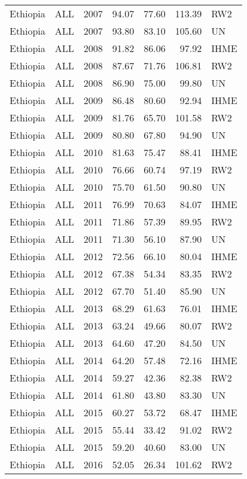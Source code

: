 \begin{longtable}{lllrrrl}
  Ethiopia & ALL & 2007 & 94.07 & 77.60 & 113.39 & RW2 \\ 
  Ethiopia & ALL & 2007 & 93.80 & 83.10 & 105.60 & UN \\ 
  Ethiopia & ALL & 2008 & 91.82 & 86.06 & 97.92 & IHME \\ 
  Ethiopia & ALL & 2008 & 87.67 & 71.76 & 106.81 & RW2 \\ 
  Ethiopia & ALL & 2008 & 86.90 & 75.00 & 99.80 & UN \\ 
  Ethiopia & ALL & 2009 & 86.48 & 80.60 & 92.94 & IHME \\ 
  Ethiopia & ALL & 2009 & 81.76 & 65.70 & 101.58 & RW2 \\ 
  Ethiopia & ALL & 2009 & 80.80 & 67.80 & 94.90 & UN \\ 
  Ethiopia & ALL & 2010 & 81.63 & 75.47 & 88.41 & IHME \\ 
  Ethiopia & ALL & 2010 & 76.66 & 60.74 & 97.19 & RW2 \\ 
  Ethiopia & ALL & 2010 & 75.70 & 61.50 & 90.80 & UN \\ 
  Ethiopia & ALL & 2011 & 76.99 & 70.63 & 84.07 & IHME \\ 
  Ethiopia & ALL & 2011 & 71.86 & 57.39 & 89.95 & RW2 \\ 
  Ethiopia & ALL & 2011 & 71.30 & 56.10 & 87.90 & UN \\ 
  Ethiopia & ALL & 2012 & 72.56 & 66.10 & 80.04 & IHME \\ 
  Ethiopia & ALL & 2012 & 67.38 & 54.34 & 83.35 & RW2 \\ 
  Ethiopia & ALL & 2012 & 67.70 & 51.40 & 85.90 & UN \\ 
  Ethiopia & ALL & 2013 & 68.29 & 61.63 & 76.01 & IHME \\ 
  Ethiopia & ALL & 2013 & 63.24 & 49.66 & 80.07 & RW2 \\ 
  Ethiopia & ALL & 2013 & 64.60 & 47.20 & 84.50 & UN \\ 
  Ethiopia & ALL & 2014 & 64.20 & 57.48 & 72.16 & IHME \\ 
  Ethiopia & ALL & 2014 & 59.27 & 42.36 & 82.38 & RW2 \\ 
  Ethiopia & ALL & 2014 & 61.80 & 43.80 & 83.30 & UN \\ 
  Ethiopia & ALL & 2015 & 60.27 & 53.72 & 68.47 & IHME \\ 
  Ethiopia & ALL & 2015 & 55.44 & 33.42 & 91.02 & RW2 \\ 
  Ethiopia & ALL & 2015 & 59.20 & 40.60 & 83.00 & UN \\ 
  Ethiopia & ALL & 2016 & 52.05 & 26.34 & 101.62 & RW2 \\ 

\end{longtable}
